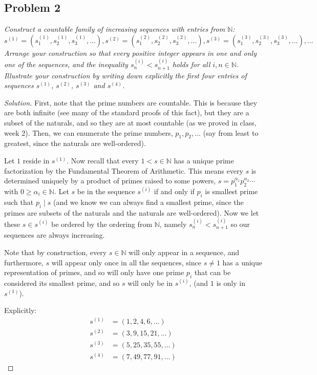 \documentclass{article}
\newcommand{\N}{{\mathbb N}}
\begin{document}
\subsection*{Problem 2}
{\it Construct a countable family of increasing sequences with entries from $\N$:
\[s^{(1)} = \left(s_1^{(1)}, s_2^{(1)}, s_3^{(1)}, \dots \right),
s^{(2)} = \left(s_1^{(2)}, s_2^{(2)}, s_3^{(2)}, \dots \right),
s^{(3)} = \left(s_1^{(3)}, s_2^{(3)}, s_3^{(3)}, \dots \right), \dots\]
Arrange your construction so that every positive integer appears
in one and only one of the sequences,
and the inequality $s_n^{(i)} < s_{n+1}^{(i)}$ holds for all $i,n\in\N$.
Illustrate your construction by writing down explicitly
the first four entries of sequences $s^{(1)}$, $s^{(2)}$, $s^{(3)}$ and $s^{(4)}$.
}
\begin{proof}[Solution]\let\qed\relax
	First, note that the prime numbers are countable.
	This is because they are both infinite (see many of the standard proofs of this fact),
	but they are a subset of the naturals,
	and so they are at most countable (as we proved in class, week 2).
	Then, we can enumerate the prime numbers, $p_1,p_2,\dots$
	(say from least to greatest, since the naturals are well-ordered).

	Let $1$ reside in $s^{(1)}$.
	Now recall that every $1 < s \in \N$ has a unique prime factorization
	by the Fundamental Theorem of Arithmetic.
	This means every $s$ is determined uniquely by a product
	of primes raised to some powers,
	$s = p_1^{\alpha_1}p_2^{\alpha_2}\cdots$ with $0 \geq \alpha_i \in \N$.
	Let $s$ be in the sequence $s^{(i)}$ if and only if
	$p_i$ is smallest prime such that $p_i\mid s$
	(and we know we can always find a smallest prime,
	since the primes are subsets of the naturals and the naturals are well-ordered).
	Now we let these $s \in s^{(i)}$ be ordered by the ordering from $\N$,
	namely $s_n^{(i)} < s_{n+1}^{(i)}$ so our sequences are always increasing.
	
	Note that by construction, every $s \in \N$ will only appear in a sequence,
	and furthermore, $s$ will appear only once in all the sequences,
	since $s \neq 1$ has a unique representation of primes,
	and so will only have one prime $p_i$ that can be considered its smallest prime,
	and so $s$ will only be in $s^{(i)}$,
	(and $1$ is only in $s^{(1)}$).

	Explicitly:
	\begin{align*}
		s^{(1)} &= (1, 2, 4, 6, \dots)\\
		s^{(2)} &= (3, 9, 15, 21, \dots)\\
		s^{(3)} &= (5, 25, 35, 55, \dots)\\
		s^{(4)} &= (7, 49, 77, 91, \dots)
	\end{align*}
\end{proof}
\clearpage
\end{document}
